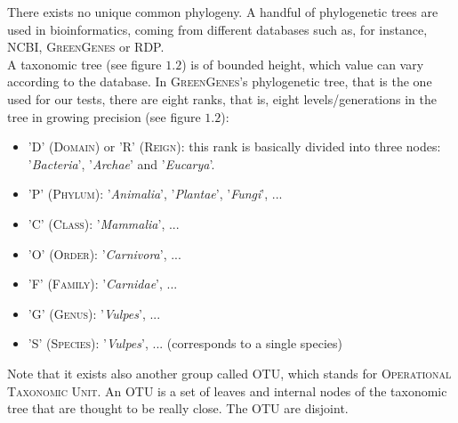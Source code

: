 \documentclass{report}
\begin{document}
There exists no unique common phylogeny. A handful of phylogenetic trees are used in bioinformatics, coming from different databases such as, for instance, NCBI, \textsc{GreenGenes} or RDP.\\

A taxonomic tree (see figure $1.2$) is of bounded height, which value can vary according to the database. In \textsc{GreenGenes}'s phylogenetic tree, that is the one used for our tests, there are eight ranks, that is, eight levels/generations in the tree in growing precision (see figure $1.2$):
\begin{itemize}
\item 'D' (\textsc{Domain}) or 'R' (\textsc{Reign}): this rank is basically divided into three nodes: '\emph{Bacteria}', '\emph{Archae}' and '\emph{Eucarya}'.
\item 'P' (\textsc{Phylum}): '\emph{Animalia}', '\emph{Plantae}', '\emph{Fungi}', ...
\item 'C' (\textsc{Class}): '\emph{Mammalia}', ...
\item 'O' (\textsc{Order}): '\emph{Carnivora}', ...
\item 'F' (\textsc{Family}): '\emph{Carnidae}', ...
\item 'G' (\textsc{Genus}): '\emph{Vulpes}', ...
\item 'S' (\textsc{Species}): '\emph{Vulpes}', ... (corresponds to a single species)
\end{itemize} 

Note that it exists also another group called OTU, which stands for \textsc{Operational Taxonomic Unit}. An OTU is a set of leaves and internal nodes of the taxonomic tree that are thought to be really close. The OTU are disjoint.\\
\end{document}
